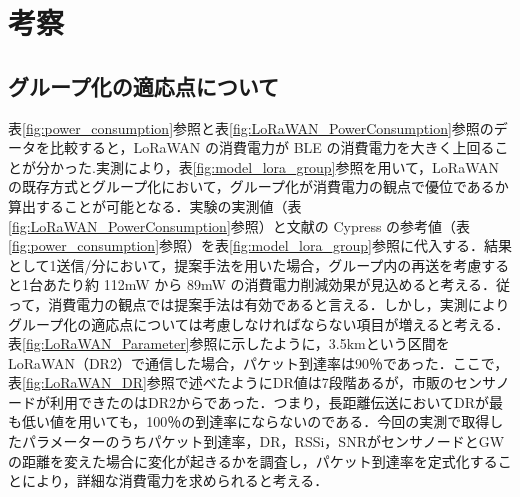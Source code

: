 \chapter{考察}
\section{グループ化の適応点について}
表\ref{fig:power_consumption}参照と表\ref{fig:LoRaWAN_PowerConsumption}参照のデータを比較すると，LoRaWAN の消費電力が BLE の消費電力を大きく上回ることが分かった.実測により，表\ref{fig:model_lora_group}参照を用いて，LoRaWANの既存方式とグループ化において，グループ化が消費電力の観点で優位であるか算出することが可能となる．実験の実測値（表\ref{fig:LoRaWAN_PowerConsumption}参照）と文献の Cypress の参考値（表\ref{fig:power_consumption}参照）を表\ref{fig:model_lora_group}参照に代入する．結果として1送信/分において，提案手法を用いた場合，グループ内の再送を考慮すると1台あたり約 112mW から 89mW の消費電力削減効果が見込めると考える．従って，消費電力の観点では提案手法は有効であると言える．しかし，実測によりグループ化の適応点については考慮しなければならない項目が増えると考える．表\ref{fig:LoRaWAN_Parameter}参照に示したように，3.5kmという区間をLoRaWAN（DR2）で通信した場合，パケット到達率は90％であった．ここで，表\ref{fig:LoRaWAN_DR}参照で述べたようにDR値は7段階あるが，市販のセンサノードが利用できたのはDR2からであった．つまり，長距離伝送においてDRが最も低い値を用いても，100％の到達率にならないのである．今回の実測で取得したパラメーターのうちパケット到達率，DR，RSSi，SNRがセンサノードとGWの距離を変えた場合に変化が起きるかを調査し，パケット到達率を定式化することにより，詳細な消費電力を求められると考える．